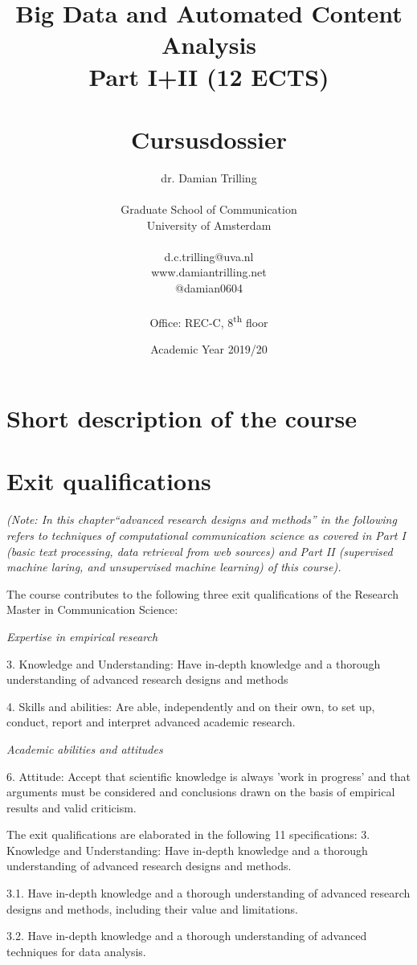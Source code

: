 \documentclass[a4paper,12pt]{report}
\title{Big Data and Automated Content Analysis\\ Part I+II (12 ECTS)\\~\\Cursusdossier}
\author{dr. Damian Trilling\\~\\Graduate School of Communication\\University of Amsterdam\\~\\d.c.trilling@uva.nl\\www.damiantrilling.net\\@damian0604\\~\\Office: REC-C, 8\textsuperscript{th} floor}
\date{Academic Year 2019/20}
\begin{document}
\maketitle

\tableofcontents


\chapter{Short description of the course}



\chapter{Exit qualifications}


\emph{(Note: In this chapter``advanced research designs and methods'' in the following refers to techniques of computational communication science as covered in Part I (basic text processing, data retrieval from web sources) and Part II (supervised machine laring, and unsupervised machine learning) of this course).}


The course contributes to the following three exit qualifications of the Research Master in Communication Science:


\textit{Expertise in empirical research}


	3.	Knowledge and Understanding: Have in-depth knowledge and a thorough understanding of advanced research designs and methods


	4.	Skills and abilities: Are able, independently and on their own, to set up, conduct, report and interpret advanced academic research.


\textit{Academic abilities and attitudes}


	6.	Attitude: Accept that scientific knowledge is always 'work in progress' and that arguments must be considered and conclusions drawn on the basis of empirical results and valid criticism.


The exit qualifications are elaborated in the following 11 specifications:
3. Knowledge and Understanding: Have in-depth knowledge and a thorough understanding of advanced research designs and methods. 


3.1. Have in-depth knowledge and a thorough understanding of advanced research designs and methods, including their value and limitations.


3.2.	Have in-depth knowledge and a thorough understanding of advanced techniques for data analysis.
\end{document}
